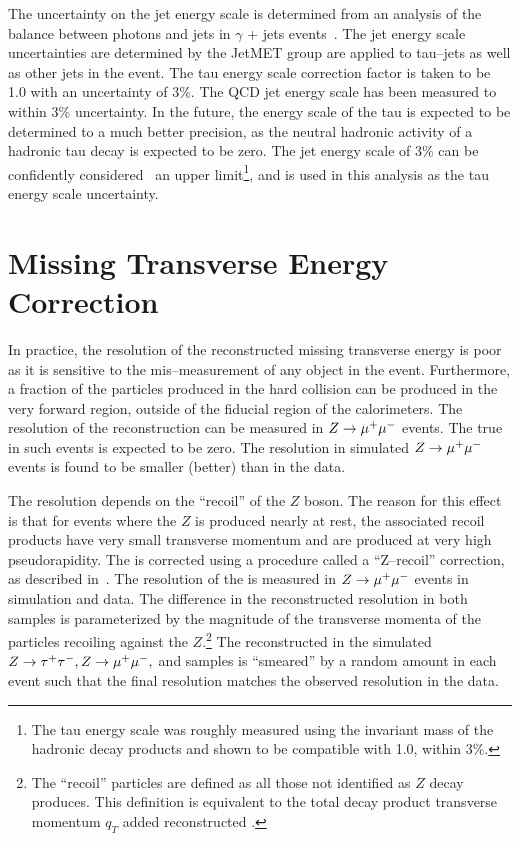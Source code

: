 The uncertainty on the jet energy scale is determined from an analysis of the
\pt balance between photons and jets in $\gamma$ + jets
events~\cite{CMS-PAS-JME-10-010}.  The jet energy scale uncertainties are
determined by the JetMET group are applied to tau--jets as well as other jets in
the event.  The tau energy scale correction factor is taken to be 1.0
with an uncertainty of 3\%.  The QCD jet energy scale has been measured to
within 3\% uncertainty.  In the future, the energy scale of the tau is expected
to be determined to a much better precision, as the neutral hadronic activity of
a hadronic tau decay is expected to be zero. The jet energy scale of 3\% can be
confidently considered~\cite{CMS-PAS-TAU-11-001} an upper limit\footnote{The tau
energy scale was roughly measured using the invariant mass of the hadronic decay
products and shown to be compatible with 1.0, within 3\%.}, and is used in this
analysis as the tau energy scale uncertainty.

\section{Missing Transverse Energy Correction}
\label{sec:ZRecoilCorr} In practice, the resolution of the reconstructed missing
transverse energy is poor as it is sensitive to the mis--measurement of any
object in the event. Furthermore, a fraction of the particles produced in the
hard collision can be produced in the very forward region, outside of the
fiducial region of the calorimeters.  The resolution of the \MET reconstruction
can be measured in $Z\to\mu^+\mu^-$ events. The true \MET in such
events is expected to be zero.  The \MET resolution in simulated $Z\to\mu^+\mu^-$
events is found to be smaller (better) than in the data.  

The \MET resolution depends on the ``recoil'' of the $Z$ boson.  The reason for
this effect is that for events where the $Z$ is produced nearly at rest, the
associated recoil products have very small transverse momentum and are produced
at very high pseudorapidity.  The \MET is corrected using a procedure called a
``Z--recoil'' correction, as described in~\cite{CMS_AN_2010-332}.  The
resolution of the \MET is measured in $Z\to\mu^+\mu^-$ events in simulation and data.
The difference in the reconstructed \MET resolution in both samples is
parameterized by the magnitude of the transverse momenta of the particles
recoiling against the $Z$.\footnote{The ``recoil'' particles are defined as all
those not identified as $Z$ decay produces. This definition is equivalent to the
total decay product transverse momentum $q_T$ added reconstructed \MET.}  The
reconstructed \MET in the simulated $\mbox{\ensuremath{Z\to\tau^+\tau^-}}, \mbox{\ensuremath{Z\to\mu^+\mu^-}},$ and \WpJets samples is
``smeared'' by a random amount in each event such that the final resolution
matches the observed resolution in the data.

